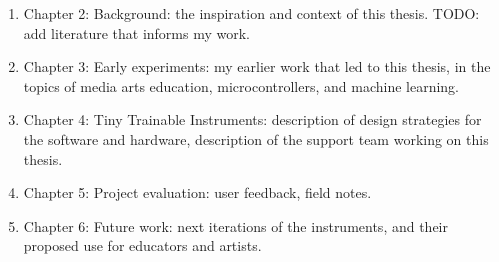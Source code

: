 \begin{enumerate}
        \item Chapter 2: Background: the inspiration and context of this thesis. TODO: add literature that informs my work.
    \item Chapter 3: Early experiments: my earlier work that led to this thesis, in the topics of media arts education, microcontrollers, and machine learning.
    \item Chapter 4: Tiny Trainable Instruments: description of design strategies for the software and hardware, description of the support team working on this thesis.
    \item Chapter 5: Project evaluation: user feedback, field notes.
    \item Chapter 6: Future work: next iterations of the instruments, and their proposed use for educators and artists.
  \end{enumerate}
